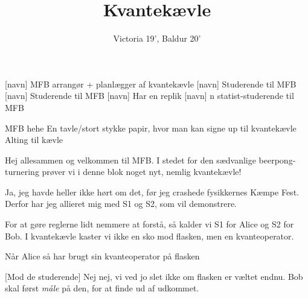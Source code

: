 \documentclass[a4paper,11pt]{article}
\title{Kvantekævle}
\author{Victoria 19', Baldur 20'}
\begin{document}
\maketitle

\begin{roles}
[navn] MFB arrangør + planlægger af kvantekævle
[navn] Studerende til MFB
[navn] Studerende til MFB
[navn] Har en replik
[navn] n statist-studerende til MFB
\end{roles}

\begin{props}
 MFB hehe
 En tavle/stort stykke papir, hvor man kan signe up til kvantekævle
 Alting til kævle
\end{props}


\begin{sketch}

 Hej allesammen og velkommen til MFB. I stedet for den sædvanlige beerpong-turnering prøver vi i denne blok noget nyt, nemlig kvantekævle! 


 Ja, jeg havde heller ikke hørt om det, før jeg crashede fysikkernes Kæmpe Fest. Derfor har jeg allieret mig med S1 og S2, som vil demonstrere.


 For at gøre reglerne lidt nemmere at forstå, så kalder vi S1 for Alice og S2 for Bob. 
I kvantekævle kaster vi ikke en sko mod flasken, men en kvanteoperator.


 Når Alice så har brugt sin kvanteoperator på flasken 


[Mod de studerende] Nej nej, vi ved jo slet ikke om flasken er væltet endnu. Bob skal først \textit{måle} på den, for at finde ud af udkommet.



\end{sketch}
\end{document}

